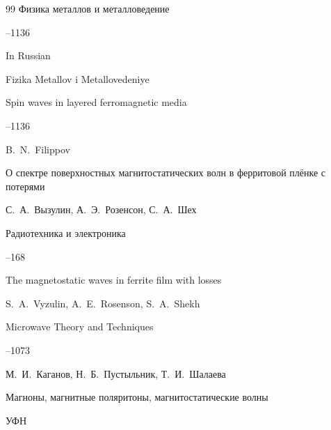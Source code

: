 \begin{thebibliography}{99}
\jour Физика металлов и металловедение




--1136

\misctransl

\lang In Russian

\jour Fizika Metallov i Metallovedeniye

\paper Spin waves in layered ferromagnetic media




--1136

\by B.~N.~Filippov






\paper О спектре поверхностных магнитостатических волн в ферритовой плёнке с потерями 

\by С.~А.~Вызулин, А.~Э.~Розенсон, С.~А.~Шех 

\jour Радиотехника и электроника 



--168

\transl 

\paper  The magnetostatic waves in ferrite film with losses

\by S.~A.~Vyzulin, A.~E.~Rosenson, S.~A.~Shekh


\jour Microwave Theory and Techniques




--1073








\by М.~И.~Каганов, Н.~Б.~Пустыльник, Т.~И.~Шалаева

\paper Магноны, магнитные поляритоны, магнитостатические волны

\jour УФН





\end{thebibliography}
